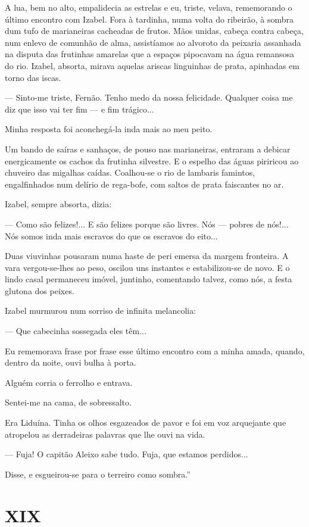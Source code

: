 A lua, bem no alto, empalidecia as estrelas e eu, triste, velava,
rememorando o último encontro com Izabel. Fora à tardinha, numa volta do
ribeirão, à sombra dum tufo de marianeiras cacheadas de frutos. Mãos
unidas, cabeça contra cabeça, num enlevo de comunhão de alma,
assistíamos ao alvoroto da peixaria assanhada na disputa das frutinhas
amarelas que a espaços pipocavam na água remansosa do rio. Izabel,
absorta, mirava aquelas ariscas linguinhas de prata, apinhadas em torno
das iscas.

--- Sinto-me triste, Fernão. Tenho medo da nossa felicidade. Qualquer
coisa me diz que isso vai ter fim --- e fim trágico...

Minha resposta foi aconchegá-la inda mais ao meu peito.

Um bando de saíras e sanhaços, de pouso nas marianeiras, entraram a
debicar energicamente os cachos da frutinha silvestre. E o espelho das
águas piriricou ao chuveiro das migalhas caídas. Coalhou-se o rio de
lambaris famintos, engalfinhados num delírio de rega-bofe, com saltos de
prata faiscantes no ar.

Izabel, sempre absorta, dizia:

--- Como são felizes!... E são felizes porque são livres. Nós --- pobres
de nós!... Nós somos inda mais escravos do que os escravos do eito...

Duas viuvinhas pousaram numa haste de peri emersa da margem fronteira. A
vara vergou-se-lhes ao peso, oscilou uns instantes e estabilizou-se de
novo. E o lindo casal permaneceu imóvel, juntinho, comentando talvez,
como nós, a festa glutona dos peixes.

Izabel murmurou num sorriso de infinita melancolia:

--- Que cabecinha sossegada eles têm...

Eu rememorava frase por frase esse último encontro com a minha amada,
quando, dentro da noite, ouvi bulha à porta.

Alguém corria o ferrolho e entrava.

Sentei-me na cama, de sobressalto.

Era Liduína. Tinha os olhos esgazeados de pavor e foi em voz arquejante
que atropelou as derradeiras palavras que lhe ouvi na vida.

--- Fuja! O capitão Aleixo sabe tudo. Fuja, que estamos perdidos...

Disse, e esgueirou-se para o terreiro como sombra.''

\section{XIX}

